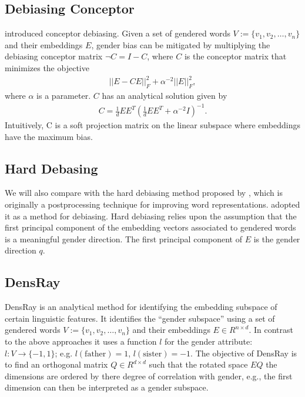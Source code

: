 
\subsection{Debiasing Conceptor}
 introduced conceptor debiasing. Given a set of gendered words $V:=\{v_1,v_2,\dots,v_n\}$ and their embeddings $E$, gender bias can be mitigated by multiplying the debiasing conceptor matrix $\neg C= I-C$, where $C$ is the conceptor matrix that minimizes the objective
\begin{eqnarray}
||E-CE||^2_F+\alpha^{-2}||E||^2_F,
\end{eqnarray}
where $\alpha$ is a parameter. $C$ has an analytical solution given by
\begin{eqnarray}
C=\frac{1}{d}EE^{T}(\frac{1}{d}EE^{T}+\alpha^{-2}I)^{-1}.
\end{eqnarray}
Intuitively, C is a soft projection matrix on the linear subspace where embeddings have the maximum bias.


\subsection{Hard Debasing}
We will also compare with the hard debiasing method proposed
by , which is originally a postprocessing
technique for improving word
representations.  adopted it as a
method for debiasing. Hard debiasing relies upon
the assumption that the first principal component of the embedding vectors associated to gendered words is a meaningful gender direction. The first principal component of $E$ is the gender direction $q$.

\subsection{DensRay}
DensRay \cite{dufter2019analytical} is an analytical method for identifying the
embedding subspace of certain linguistic features. It
identifies the ``gender subspace'' using a set of gendered words
$V:=\{v_1,v_2,\dots,v_n\}$ and their embeddings $E \in
R^{n\times d}$. In contrast to the above approaches it uses a function $l$ for the gender attribute:
$l:V\to \{-1,1\}$;
e.g. $l(\mbox{father})=1$, $l(\mbox{sister})=-1$. The objective of DensRay
is to find an orthogonal matrix $Q\in R^{d\times d}$ such
that the rotated space $EQ$ the dimensions are ordered by there degree of correlation with gender, e.g., the first dimension can then be interpreted as a gender subspace.

